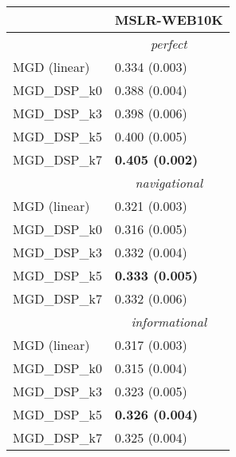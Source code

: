 \begin{tabular*}{\textwidth}{@{\extracolsep{\fill} } l  l  }
\toprule
 & { \small \textbf{MSLR-WEB10K}} \\
\midrule
& \multicolumn{1}{|c|}{\textit{perfect}} \\
\midrule
MGD (linear) & 0.334 {\tiny (0.003)} \\
MGD\_DSP\_k0 & 0.388 {\tiny (0.004)}  \\
MGD\_DSP\_k3 & 0.398 {\tiny (0.006)}  \\
MGD\_DSP\_k5 & 0.400 {\tiny (0.005)}  \\
MGD\_DSP\_k7 & \bf 0.405 {\tiny (0.002)}  \\
\midrule
& \multicolumn{1}{|c|}{\textit{navigational}} \\
\midrule
MGD (linear) & 0.321 {\tiny (0.003)} \\
MGD\_DSP\_k0 & 0.316 {\tiny (0.005)}  \\
MGD\_DSP\_k3 & 0.332 {\tiny (0.004)}  \\
MGD\_DSP\_k5 & \bf 0.333 {\tiny (0.005)}  \\
MGD\_DSP\_k7 & 0.332 {\tiny (0.006)}  \\
\midrule
& \multicolumn{1}{|c|}{\textit{informational}} \\
\midrule
MGD (linear) & 0.317 {\tiny (0.003)} \\
MGD\_DSP\_k0 & 0.315 {\tiny (0.004)}  \\
MGD\_DSP\_k3 & 0.323 {\tiny (0.005)}  \\
MGD\_DSP\_k5 & \bf 0.326 {\tiny (0.004)}  \\
MGD\_DSP\_k7 & 0.325 {\tiny (0.004)}  \\
\bottomrule
\end{tabular*}
